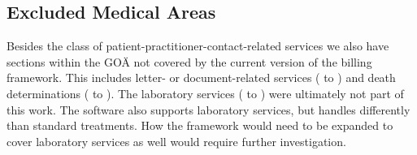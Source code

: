 \subsection{Excluded Medical Areas}\label{subsec:excluded-medical-areas}
Besides the class of patient-practitioner-contact-related services we also have sections within the GOÄ not covered by the current version of the billing framework.
This includes letter- or document-related services ( to ) and death determinations ( to ).
The laboratory services ( to ) were ultimately not part of this work.
The software also supports laboratory services, but handles differently than standard treatments.
How the framework would need to be expanded to cover laboratory services as well would require further investigation.







